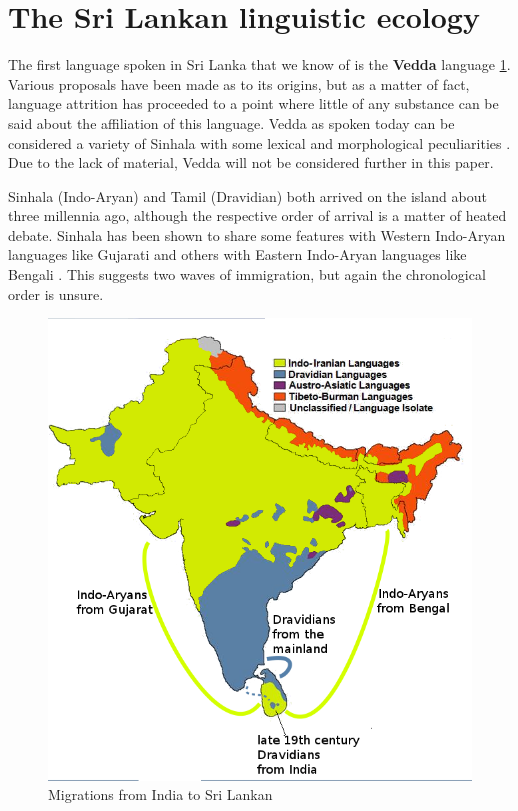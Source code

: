 \documentclass[handout,utf8]{article}
\begin{document}
\section{The Sri Lankan linguistic ecology}
The first language spoken in Sri Lanka that we know of is the \textbf{Vedda} language \ref{}. Various proposals have been made as to its origins, but as a matter of fact, language attrition has proceeded to a point where little of any substance can be said about the affiliation of this language. Vedda as spoken today can be considered a variety of Sinhala with some lexical and morphological peculiarities \citep{abc}. Due to the lack of material, Vedda will not be considered further in this paper. 

Sinhala (Indo-Aryan) and Tamil (Dravidian) both arrived on the island about three millennia ago, although the respective order of arrival is a matter of heated debate. Sinhala has been shown to share some features with Western Indo-Aryan languages like Gujarati and others with Eastern Indo-Aryan languages like Bengali \citep{Geiger}. This suggests two waves of immigration, but again the chronological order is unsure. 

\begin{figure}
\begin{center}
 \includegraphics[height=.5\textheight]{insl.png}\end{center}
 \caption{Migrations from India to Sri Lankan}
\end{figure}
\end{document}
